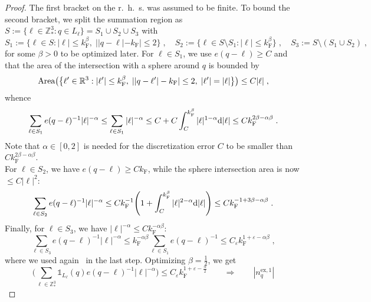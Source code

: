 \documentclass[12pt,a4paper]{article}
\numberwithin{equation}{section}
\newcommand{\1}{\mathbb{I}}
\newcommand{\di}{\textnormal{d}}
\newcommand{\ex}{\mathrm{ex}}
\newcommand{\F}{\mathrm{F}}
\newcommand{\R}{\mathbb{R}}
\newcommand{\Z}{\mathbb{Z}}
\theoremstyle{plain}
\theoremstyle{definition}
\theoremstyle{remark}
\theoremstyle{plain}
\theoremstyle{definition}
\theoremstyle{remark}
\begin{document}
\begin{proof}
The first bracket on the r.~h.~s. was assumed to be finite. To bound the second bracket, we split the summation region as $ S := \{ \ell \in \Z^3_* : q \in L_\ell \} = S_1 \cup S_2 \cup S_3 $ with
\begin{equation}
	S_1 := \{ \ell \in S : |\ell| \le k_{\F}^\beta, \; ||q-\ell|-k_{\F}| \le 2 \} \;, \quad
	S_2 := \{ \ell \in S \setminus S_1 : |\ell| \le k_{\F}^\beta \} \;, \quad
	S_3 := S \setminus (S_1 \cup S_2) \;,
\end{equation}
for some $ \beta > 0 $ to be optimized later. For $ \ell \in S_1 $, we use $ e(q-\ell) \ge C $ and that the area of the intersection with a sphere around $ q $ is bounded by
\begin{equation*}
	\textnormal{Area} \big( \big\{ \ell' \in \R^3 : |\ell'| \le k_{\F}^\beta, \; ||q-\ell'|-k_{\F}| \le 2, \; |\ell'| = |\ell| \big\} \big)
	\leq C |\ell| \;,
\end{equation*}
whence
\begin{equation}
	\sum_{\ell \in S_1} e(q-\ell)^{-1} |\ell|^{-\alpha}
	\leq \sum_{\ell \in S_1} |\ell|^{-\alpha}
	\leq C + C \int_C^{k_{\F}^\beta} |\ell|^{1-\alpha}  \di |\ell|
	\le C k_{\F}^{2 \beta - \alpha \beta} \;.
\end{equation}
Note that $ \alpha \in [0,2] $ is needed for the discretization error $ C $ to be smaller than $C k_{\F}^{2 \beta - \alpha \beta} $.\\
For $ \ell \in S_2 $, we have $ e(q-\ell) \ge C k_{\F} $, while the sphere intersection area is now $ \leq C |\ell|^2 $:
\begin{equation}
	\sum_{\ell \in S_2} e(q-\ell)^{-1} |\ell|^{-\alpha}
	\leq C k_{\F}^{-1} \Bigg( 1 + \int_C^{k_{\F}^\beta} |\ell|^{2-\alpha} \di |\ell| \Bigg)
	\le C k_{\F}^{-1 + 3 \beta - \alpha \beta} \;.
\end{equation}
Finally, for $ \ell \in S_3 $, we have $ |\ell|^{-\alpha} \le C k_{\F}^{-\alpha \beta} $:
\begin{equation}
	\sum_{\ell \in S_3} e(q-\ell)^{-1} |\ell|^{-\alpha}
	\le k_{\F}^{-\alpha \beta} \sum_{\ell \in S_1} e(q-\ell)^{-1}
	\le C_\varepsilon k_{\F}^{1 + \varepsilon - \alpha \beta} \;,
\end{equation}
where we used again~\cite[Lemma~3.2]{CHN24} in the last step. Optimizing $ \beta = \frac 12 $, we get
\begin{equation}
	\Bigg( \sum_{\ell \in \Z^3_*} \mathds{1}_{L_\ell}(q) e(q-\ell)^{-1} |\ell|^{-\alpha} \Bigg)
	\le C_\varepsilon k_{\F}^{1 + \varepsilon - \frac{\alpha}{2}} \qquad \Rightarrow \qquad
	|n_q^{\ex,1}|

\end{equation}
\end{proof}
\end{document}
